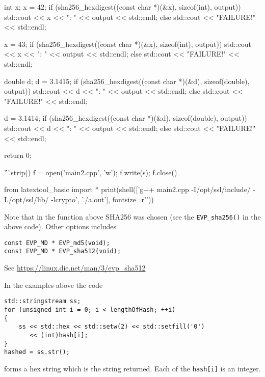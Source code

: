 \begin{python}
{    int x;
    x = 42;
    if (sha256_hexdigest((const char *)(&x), sizeof(int), output))
    {
        std::cout << x << ": " << output << std::endl;
    }
    else
    {
        std::cout << "FAILURE!" << std::endl;
    }

    x = 43;
    if (sha256_hexdigest((const char *)(&x), sizeof(int), output))
    {
        std::cout << x << ": " << output << std::endl;
    }
    else
    {
        std::cout << "FAILURE!" << std::endl;
    }

    double d;
    d = 3.1415;
    if (sha256_hexdigest((const char *)(&d), sizeof(double), output))
    {
        std::cout << d << ": " << output << std::endl;
    }
    else
    {
        std::cout << "FAILURE!" << std::endl;
    }
    
    d = 3.1414;
    if (sha256_hexdigest((const char *)(&d), sizeof(double), output))
    {
        std::cout << d << ": " << output << std::endl;
    }
    else
    {
        std::cout << "FAILURE!" << std::endl;
    }

    return 0;
}
'''.strip()
f = open('main2.cpp', 'w'); f.write(s); f.close()
\end{python}
\vspace{-0.1cm}
\begin{python}
from latextool_basic import *
print(shell(['g++ main2.cpp -I/opt/ssl/include/ -L/opt/ssl/lib/ -lcrypto', './a.out'], fontsize=r'\scriptsize'))
\end{python}


Note that in the function above SHA256 was chosen
(see the \verb!EVP_sha256()! in the above code).
Other options includes
\begin{Verbatim}[frame=single,fontsize=\small]
const EVP_MD * EVP_md5(void);
const EVP_MD * EVP_sha512(void);
\end{Verbatim}
See \url{https://linux.die.net/man/3/evp_sha512}

In the examples above the code
\begin{Verbatim}[frame=single,fontsize=\small]
std::stringstream ss;
for (unsigned int i = 0; i < lengthOfHash; ++i)
{
    ss << std::hex << std::setw(2) << std::setfill('0')
       << (int)hash[i];
}
hashed = ss.str();
\end{Verbatim}
forms a hex string which is the string returned.
Each of the \verb!hash[i]! is an integer.
